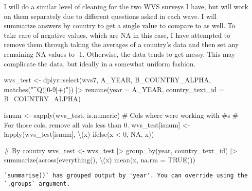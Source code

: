 \documentclass[
  letterpaper,
  DIV=11,
  numbers=noendperiod]{scrartcl}
\newenvironment{Shaded}{\begin{snugshade}}{\end{snugshade}}
\newcommand{\AttributeTok}[1]{\textcolor[rgb]{0.40,0.45,0.13}{#1}}
\newcommand{\CommentTok}[1]{\textcolor[rgb]{0.37,0.37,0.37}{#1}}
\newcommand{\ConstantTok}[1]{\textcolor[rgb]{0.56,0.35,0.01}{#1}}
\newcommand{\DecValTok}[1]{\textcolor[rgb]{0.68,0.00,0.00}{#1}}
\newcommand{\FunctionTok}[1]{\textcolor[rgb]{0.28,0.35,0.67}{#1}}
\newcommand{\NormalTok}[1]{\textcolor[rgb]{0.00,0.23,0.31}{#1}}
\newcommand{\OtherTok}[1]{\textcolor[rgb]{0.00,0.23,0.31}{#1}}
\newcommand{\SpecialCharTok}[1]{\textcolor[rgb]{0.37,0.37,0.37}{#1}}
\newcommand{\StringTok}[1]{\textcolor[rgb]{0.13,0.47,0.30}{#1}}
\begin{document}
I will do a similar level of cleaning for the two WVS surveys I have,
but will work on them separately due to different questions asked in
each wave. I will summarize answers by country to get a single value to
compare to as well. To take care of negative values, which are NA in
this case, I have attempted to remove them through taking the averages
of a country's data and then set any remaining NA values to -1.
Otherwise, the data tends to get messy. This may complicate the data,
but ideally in a somewhat uniform fashion.

\begin{Shaded}
\begin{Highlighting}[]
\NormalTok{wvs\_test }\OtherTok{\textless{}{-}}\NormalTok{ dplyr}\SpecialCharTok{::}\FunctionTok{select}\NormalTok{(wvs7, A\_YEAR, B\_COUNTRY\_ALPHA, }\FunctionTok{matches}\NormalTok{(}\StringTok{"\^{}Q([0{-}9]+)"}\NormalTok{)) }\SpecialCharTok{|\textgreater{}}
  \FunctionTok{rename}\NormalTok{(}\AttributeTok{year =}\NormalTok{ A\_YEAR, }\AttributeTok{country\_text\_id =}\NormalTok{ B\_COUNTRY\_ALPHA)}

\NormalTok{isnum }\OtherTok{\textless{}{-}} \FunctionTok{sapply}\NormalTok{(wvs\_test, is.numeric) }\CommentTok{\# Cols where we\textquotesingle{}re working with \#\textquotesingle{}s}
\CommentTok{\# For those cols, remove all vals less than 0.}
\NormalTok{wvs\_test[isnum] }\OtherTok{\textless{}{-}} \FunctionTok{lapply}\NormalTok{(wvs\_test[isnum], \textbackslash{}(x) }\FunctionTok{ifelse}\NormalTok{(x }\SpecialCharTok{\textless{}} \DecValTok{0}\NormalTok{, }\ConstantTok{NA}\NormalTok{, x))}

\CommentTok{\# By country}
\NormalTok{wvs\_test }\OtherTok{\textless{}{-}}\NormalTok{ wvs\_test }\SpecialCharTok{|\textgreater{}}
  \FunctionTok{group\_by}\NormalTok{(year, country\_text\_id) }\SpecialCharTok{|\textgreater{}}
  \FunctionTok{summarize}\NormalTok{(}\FunctionTok{across}\NormalTok{(}\FunctionTok{everything}\NormalTok{(), \textbackslash{}(x) }\FunctionTok{mean}\NormalTok{(x, }\AttributeTok{na.rm =} \ConstantTok{TRUE}\NormalTok{)))}
\end{Highlighting}
\end{Shaded}

\begin{verbatim}
`summarise()` has grouped output by 'year'. You can override using the
`.groups` argument.
\end{verbatim}
\end{document}
